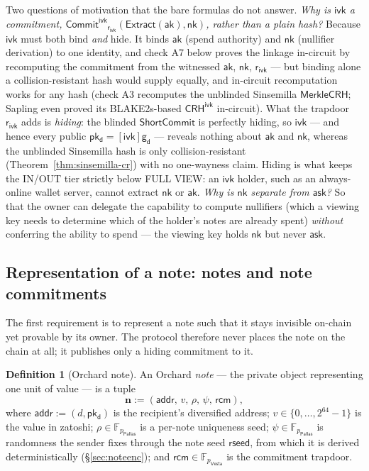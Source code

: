 \documentclass[11pt,a4paper]{article}
\theoremstyle{definition}
\newtheorem{definition}[theorem]{Definition}
\newcommand{\F}{\mathbb{F}}
\newcommand{\Pallas}{\ensuremath{\mathsf{Pallas}}}
\newcommand{\Vesta}{\ensuremath{\mathsf{Vesta}}}
\newcommand{\ShortCommit}{\ensuremath{\mathsf{ShortCommit}}}
\newcommand{\CommitIvk}{\ensuremath{\mathsf{Commit}^{\mathsf{ivk}}}}
\newcommand{\Extract}{\ensuremath{\mathsf{Extract}}}
\newcommand{\ask}{\ensuremath{\mathsf{ask}}}
\newcommand{\aksym}{\ensuremath{\mathsf{ak}}}
\newcommand{\nksym}{\ensuremath{\mathsf{nk}}}
\newcommand{\ivk}{\ensuremath{\mathsf{ivk}}}
\newcommand{\pkd}{\ensuremath{\mathsf{pk_d}}}
\newcommand{\gd}{\ensuremath{\mathsf{g_d}}}
\newcommand{\rcm}{\ensuremath{\mathsf{rcm}}}
\newcommand{\rivk}{\ensuremath{\mathsf{r_{ivk}}}}
\begin{document}
Two questions of motivation that the bare formulas do not answer. \emph{Why is $\ivk$
a commitment, $\CommitIvk_{\rivk}(\Extract(\aksym), \nksym)$, rather than a plain
hash?} Because $\ivk$ must both bind \emph{and} hide. It binds $\aksym$
(spend authority) and $\nksym$ (nullifier derivation) to one identity, and
check A7 below proves the linkage in-circuit by recomputing the commitment
from the witnessed $\aksym$, $\nksym$, $\rivk$ --- but binding alone a
collision-resistant hash would supply equally, and in-circuit recomputation
works for any hash (check A3 recomputes the unblinded Sinsemilla
$\mathsf{MerkleCRH}$; Sapling even proved its BLAKE2s-based
$\mathsf{CRH}^{\mathsf{ivk}}$ in-circuit). What the trapdoor $\rivk$ adds is
\emph{hiding}: the blinded $\ShortCommit$ is perfectly hiding, so $\ivk$ ---
and hence every public $\pkd = [\ivk]\gd$ --- reveals nothing about $\aksym$
and $\nksym$, whereas the unblinded Sinsemilla hash is only
collision-resistant (Theorem~\ref{thm:sinsemilla-cr}) with no one-wayness
claim. Hiding is what keeps the IN/OUT tier strictly below FULL VIEW: an
$\ivk$ holder, such as an always-online wallet server, cannot extract
$\nksym$ or $\aksym$.
\emph{Why is $\nksym$ separate from $\ask$?} So that the owner can delegate the
capability to compute nullifiers (which a viewing key needs to determine which
of the holder's notes are already spent) \emph{without} conferring the ability to
spend --- the viewing key holds $\nksym$ but never $\ask$.
\FloatBarrier
\subsection{Representation of a note: notes and note commitments}\label{sec:notes}

The first requirement is to represent a note such that it stays invisible
on-chain yet provable by its owner. The protocol therefore never places the note on the
chain at all; it publishes only a hiding commitment to it.

\begin{definition}[Orchard note]\label{def:note}
An Orchard \emph{note} --- the private object representing one unit of value ---
is a tuple
\[
\mathbf{n} := (\mathsf{addr},\, v,\, \rho,\, \psi,\, \rcm),
\]
where $\mathsf{addr} := (d, \pkd)$ is the recipient's diversified address;
$v \in \{0, \dots, 2^{64} - 1\}$ is the value in zatoshi;
$\rho \in \F_{p_{\Pallas}}$ is a per-note uniqueness seed;
$\psi \in \F_{p_{\Pallas}}$ is randomness the sender fixes through the note
seed $\mathsf{rseed}$, from which it is derived deterministically
(\S\ref{sec:noteenc}); and
$\rcm \in \F_{p_{\Vesta}}$ is the commitment trapdoor.
\end{definition}
\end{document}
